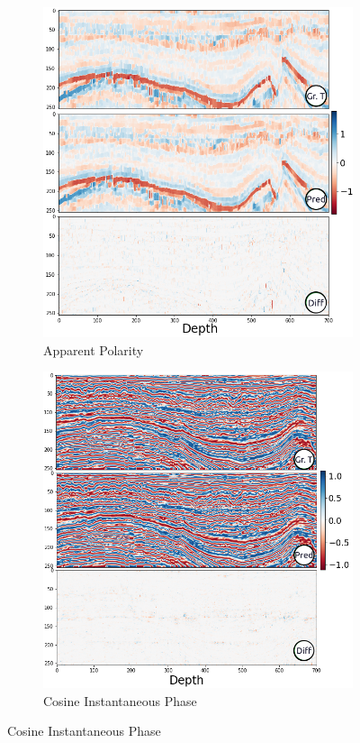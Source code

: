 \documentclass[conference]{IEEEtran}
\begin{document}
\begin{figure}[!t]
\begin{subfigure}[b]{\figattwidth\textwidth}
        \includegraphics[width=0.96\columnwidth]{Fig/newFigs/apparent-polarity-half.png}
        \caption{Apparent Polarity}
        \label{fig:apparent-polarity}
     \end{subfigure}
     \begin{subfigure}[b]{\figattwidth\textwidth}
         \centering
        \includegraphics[width=1.01\columnwidth]{Fig/newFigs/cosine-instantaneous-phase-half.png}
        \caption{Cosine Instantaneous Phase}
        \label{fig:cosine-instantaneous-phase}
     \end{subfigure}
     

\end{figure}
\end{document}
